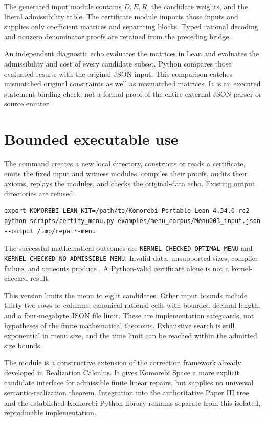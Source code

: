\documentclass[11pt,letterpaper,oneside,openany]{book}
\theoremstyle{quiet}
\newcommand{\code}[1]{\texttt{\detokenize{#1}}}
\begin{document}
The generated input module contains $D,E,R$, the candidate weights, and the literal admissibility table. The certificate module imports those inputs and supplies only coefficient matrices and separating blocks. Typed rational decoding and nonzero denominator proofs are retained from the preceding bridge.

An independent diagnostic echo evaluates the matrices in Lean and evaluates the admissibility and cost of every candidate subset. Python compares those evaluated results with the original JSON input. This comparison catches mismatched original constraints as well as mismatched matrices. It is an executed statement-binding check, not a formal proof of the entire external JSON parser or source emitter.

\section{Bounded executable use}

The command \code{scripts/certify_menu.py} creates a new local directory, constructs or reads a certificate, emits the fixed input and witness modules, compiles their proofs, audits their axioms, replays the modules, and checks the original-data echo. Existing output directories are refused.

\begin{Verbatim}[fontsize=\small,breaklines=true]
export KOMOREBI_LEAN_KIT=/path/to/Komorebi_Portable_Lean_4.34.0-rc2
python scripts/certify_menu.py examples/menu_corpus/Menu003_input.json --output /tmp/repair-menu
\end{Verbatim}

The successful mathematical outcomes are \nolinkurl{KERNEL_CHECKED_OPTIMAL_MENU} and \nolinkurl{KERNEL_CHECKED_NO_ADMISSIBLE_MENU}. Invalid data, unsupported sizes, compiler failure, and timeouts produce \code{UNRESOLVED}. A Python-valid certificate alone is not a kernel-checked result.

This version limits the menu to eight candidates. Other input bounds include thirty-two rows or columns, canonical rational cells with bounded decimal length, and a four-megabyte JSON file limit. These are implementation safeguards, not hypotheses of the finite mathematical theorems. Exhaustive search is still exponential in menu size, and the time limit can be reached within the admitted size bounds.

The module is a constructive extension of the correction framework already developed in Realization Calculus. It gives Komorebi Space a more explicit candidate interface for admissible finite linear repairs, but supplies no universal semantic-realization theorem. Integration into the authoritative Paper III tree and the established Komorebi Python library remains separate from this isolated, reproducible implementation.
\end{document}
